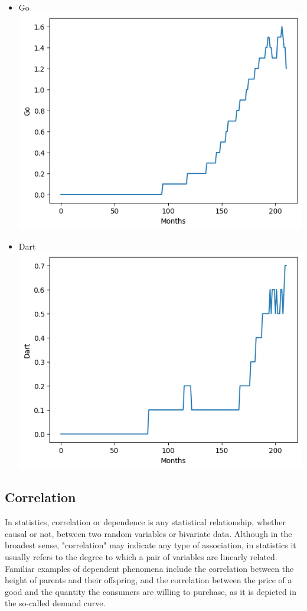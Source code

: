\documentclass[conference]{IEEEtran}
\begin{document}
\begin{itemize}
\item{Go}
\includegraphics[scale=0.4]{lineplot/go.png}
\item{Dart}
\includegraphics[scale=0.4]{lineplot/dart.png}
\end{itemize}

\subsection{Correlation}
In statistics, correlation or dependence is any statistical relationship, whether causal or not, between two random variables or bivariate data. Although in the broadest sense, "correlation" may indicate any type of association, in statistics it usually refers to the degree to which a pair of variables are linearly related. Familiar examples of dependent phenomena include the correlation between the height of parents and their offspring, and the correlation between the price of a good and the quantity the consumers are willing to purchase, as it is depicted in the so-called demand curve.
\end{document}
